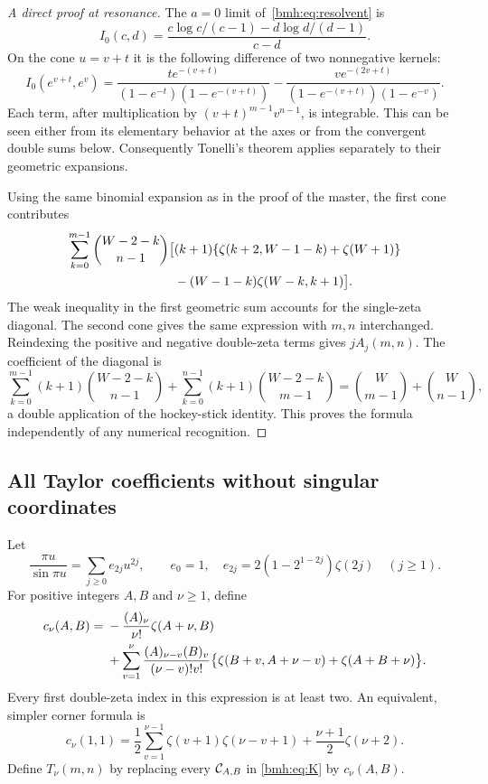 \begin{proof}[A direct proof at resonance]
The $a=0$ limit of~\eqref{bmh:eq:resolvent} is
\[
 I_0(c,d)=\frac{c\log c/(c-1)-d\log d/(d-1)}{c-d}.
\]
On the cone $u=v+t$ it is the following difference of two nonnegative
kernels:
\begin{equation}\label{bmh:eq:resonant-cone}
 I_0(e^{v+t},e^v)=
 \frac{t e^{-(v+t)}}{(1-e^{-t})(1-e^{-(v+t)})}
 -\frac{v e^{-(2v+t)}}{(1-e^{-(v+t)})(1-e^{-v})}.
\end{equation}
Each term, after multiplication by $(v+t)^{m-1}v^{n-1}$, is integrable.
This can be seen either from its elementary behavior at the axes or from
the convergent double sums below. Consequently Tonelli's theorem applies
separately to their geometric expansions.

Using the same binomial expansion as in the proof of the master, the
first cone contributes
\begin{align}
 \sum_{k=0}^{m-1}\binom{W-2-k}{n-1}
 \bigl[&(k+1)\{\zeta(k+2,W-1-k)+\zeta(W+1)\}\notag\\
       &-(W-1-k)\zeta(W-k,k+1)\bigr].
 \label{bmh:eq:resonant-unsimplified}
\end{align}
The weak inequality in the first geometric sum accounts for the
single-zeta diagonal. The second cone gives the same expression with
$m,n$ interchanged. Reindexing the positive and negative double-zeta
terms gives $jA_j(m,n)$. The coefficient of the diagonal is
\[
 \sum_{k=0}^{m-1}(k+1)\binom{W-2-k}{n-1}
 +\sum_{k=0}^{n-1}(k+1)\binom{W-2-k}{m-1}
 =\binom W{m-1}+\binom W{n-1},
\]
a double application of the hockey-stick identity. This proves the
formula independently of any numerical recognition.
\end{proof}

\subsection{All Taylor coefficients without singular coordinates}
Let
\begin{equation}\label{bmh:eq:even-coeff}
 \frac{\pi u}{\sin\pi u}=\sum_{j\ge0}e_{2j}u^{2j},
 \qquad e_0=1,\quad
 e_{2j}=2(1-2^{1-2j})\zeta(2j)\quad(j\ge1).
\end{equation}
For positive integers $A,B$ and $\nu\ge1$, define
\begin{align}
 c_\nu(A,B)={}&-\frac{(A)_\nu}{\nu!}\zeta(A+\nu,B)\notag\\
 &+\sum_{v=1}^{\nu}
 \frac{(A)_{\nu-v}(B)_v}{(\nu-v)!v!}
 \bigl\{\zeta(B+v,A+\nu-v)+\zeta(A+B+\nu)\bigr\}.
 \label{bmh:eq:cjet}
\end{align}
Every first double-zeta index in this expression is at least two. An
equivalent, simpler corner formula is
\begin{equation}\label{bmh:eq:c11jet}
 c_\nu(1,1)=\frac12\sum_{v=1}^{\nu-1}
       \zeta(v+1)\zeta(\nu-v+1)
       +\frac{\nu+1}{2}\zeta(\nu+2).
\end{equation}
Define $T_\nu(m,n)$ by replacing every $\mathcal C_{A,B}$ in
\eqref{bmh:eq:K} by $c_\nu(A,B)$.

